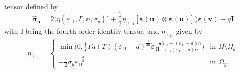 \documentclass[12pt]{article}
\newcommand{\IIinv}{{\dot\varepsilon}_{\mathrm{\!\!\:II}}}
\newcommand{\uu}{{\ensuremath{\boldsymbol{u}}}}
\newcommand{\vv}{{\ensuremath{\boldsymbol{v}}}}
\newcommand{\ssigma}{{\ensuremath{\boldsymbol{\sigma}}}}
\newcommand{\strain}{{\ensuremath{\dot{\boldsymbol{\varepsilon}}}}}
\begin{document}
tensor defined by
\begin{equation}\label{eq:sigma_hat}
\hat\ssigma_\uu  = 2 \Big(\eta(\IIinv,\Gamma, n,
\sigma_y)\mathbb{I}+\frac{1}{2} \eta_{,\IIinv} [\strain(\uu)\otimes
      \strain(\uu)]\Big)\strain(\vv) -q\textbf{I}
\end{equation}
with $\mathbb{I}$ being the fourth-order identity tensor, and
$\eta_{,\IIinv}$ given by
\begin{equation}
  \eta_{,\IIinv} \!\!=\!\!
  \begin{cases}
   \min\!\Big(0, \frac{1}{2}\Gamma
   a(T)(\IIinv-d)^{\frac{1}{2n}}\IIinv^{-\frac{1}{2}}\frac{\IIinv-(\IIinv-d)n}{\IIinv(\IIinv-d)n}\Big)
   &\text{in } \Omega\setminus\Omega_y 
   \\
   -\frac{1}{2}\sigma_{y}\IIinv^{-\frac{3}{2}}  &\text{in } \Omega_y.
  \end{cases}
\end{equation}
\end{document}
